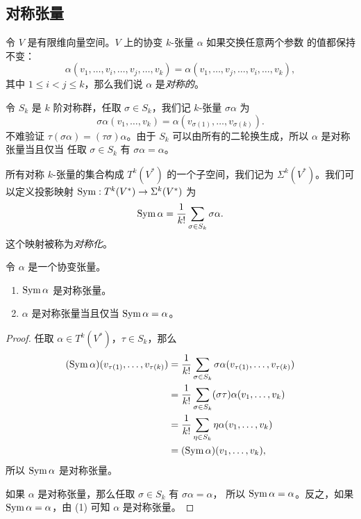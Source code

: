 \subsection{对称张量}

令 $V$ 是有限维向量空间。$V$ 上的协变 $k$-张量 $\alpha$ 如果交换任意两个参数
的值都保持不变：
\[
  \alpha(v_1,\dots,v_i,\dots,v_j,\dots,v_k)=
  \alpha(v_1,\dots,v_j,\dots,v_i,\dots,v_k),
\]
其中 $1\leq i<j\leq k$，那么我们说 $\alpha$ 是\emph{对称的}。

令 $S_k$ 是 $k$ 阶对称群，任取 $\sigma\in S_k$，我们记
$k$-张量 $\sigma\alpha$ 为
\[
  \sigma\alpha(v_1,\dots,v_k)=\alpha(v_{\sigma(1)},\dots,v_{\sigma(k)}).  
\]
不难验证 $\tau(\sigma\alpha)=(\tau\sigma)\alpha$。由于
$S_k$ 可以由所有的二轮换生成，所以 $\alpha$ 是对称张量当且仅当
任取 $\sigma\in S_k$ 有 $\sigma\alpha=\alpha$。

所有对称 $k$-张量的集合构成 $T^k(V^*)$ 的一个子空间，我们记为
$\Sigma^k(V^*)$。我们可以定义投影映射 $\operatorname{Sym}:T^k(V^*)\to \Sigma^k(V^*)$
为
\[
  \operatorname{Sym} \alpha=\frac{1}{k!}\sum_{\sigma\in S_k}\sigma\alpha.  
\]
这个映射被称为\emph{对称化}。

\begin{proposition}[对称化的性质]
  令 $\alpha$ 是一个协变张量。
  \begin{enumerate}
    \item $\operatorname{Sym}\alpha$ 是对称张量。
    \item $\alpha$ 是对称张量当且仅当 $\operatorname{Sym}\alpha=\alpha$。
  \end{enumerate}
\end{proposition}
\begin{proof}
  任取 $\alpha\in T^k(V^*)$，$\tau\in S_k$，那么
  \begin{align*}
    (\operatorname{Sym}\alpha)(v_{\tau(1)},\dots,v_{\tau(k)})&=
    \frac{1}{k!}\sum_{\sigma\in S_k}\sigma\alpha(v_{\tau(1)},\dots,v_{\tau(k)})\\
    &=\frac{1}{k!}\sum_{\sigma\in S_k}(\sigma\tau)\alpha(v_1,\dots,v_k)\\
    &=\frac{1}{k!}\sum_{\eta\in S_k}\eta\alpha(v_1,\dots,v_k)\\
    &=(\operatorname{Sym}\alpha)(v_1,\dots,v_k),
  \end{align*}
  所以 $\operatorname{Sym}\alpha$ 是对称张量。

  如果 $\alpha$ 是对称张量，那么任取 $\sigma\in S_k$ 有 $\sigma\alpha=\alpha$，
  所以 $\operatorname{Sym}\alpha=\alpha$。反之，如果 $\operatorname{Sym}\alpha=\alpha$，由 (1)
  可知 $\alpha$ 是对称张量。
\end{proof}

